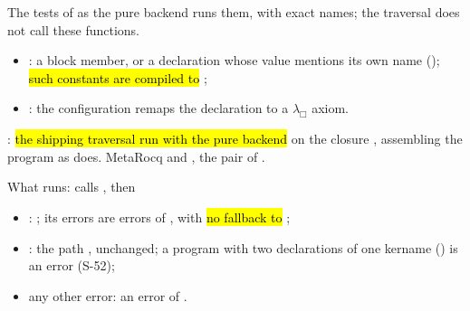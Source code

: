 \begin{definition}
  \label{def:Erasure-isRecursiveDecl}
  \leanok
   The tests of  as the pure backend runs them,
  with exact names; the traversal does not call these functions.
  \begin{itemize}
  \item {}: a block member, or a declaration whose value mentions its own name
        (); \hl{such constants are compiled to };
  \item {}: the configuration remaps the  declaration to a
        $\lambda_\Box$ axiom.
  \end{itemize}
\end{definition}

\begin{definition}
  \label{def:Erasure-erasePure}
  \leanok
   : \hl{the shipping traversal
   run with the pure backend} on the closure , assembling the program
  as  does.
   MetaRocq  and , the pair of
  .
\end{definition}

\begin{definition}
  \label{def:Erasure-eraseEntry}
  \leanok
   What  runs:  calls ,
  then
  \begin{itemize}
  \item {}: ; its errors are errors of , with
        \hl{no fallback to };
  \item {}: the  path , unchanged; a program with two
        declarations of one kername () is an error (S-52);
  \item any other error: an error of .
  \end{itemize}
\end{definition}

